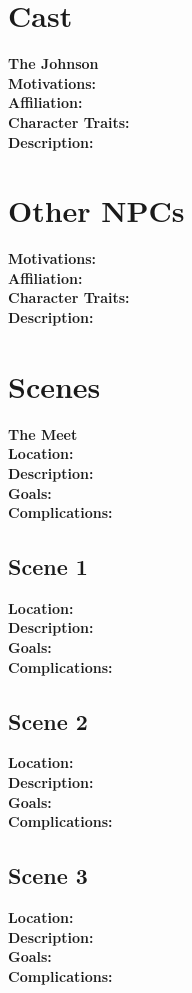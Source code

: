 \documentclass{ShadowTeXSR5}
\begin{document}
\section{Cast}
\textbf{The Johnson}\\
\textbf{Motivations:}\\
\textbf{Affiliation:}\\
\textbf{Character Traits:}\\
\textbf{Description:}

\section{Other NPCs}
\textbf{Motivations:}\\
\textbf{Affiliation:}\\
\textbf{Character Traits:}\\
\textbf{Description:}\\

\section{Scenes}
\textbf{The Meet}\\
\textbf{Location:}\\
\textbf{Description:}\\
\textbf{Goals:}\\
\textbf{Complications:}

\subsection{Scene 1}
\textbf{Location:}\\
\textbf{Description:}\\
\textbf{Goals:}\\
\textbf{Complications:}

\subsection{Scene 2}
\textbf{Location:}\\
\textbf{Description:}\\
\textbf{Goals:}\\
\textbf{Complications:}\\

\subsection{Scene 3}
\textbf{Location:}\\
\textbf{Description:}\\
\textbf{Goals:}\\
\textbf{Complications:}\\
\end{document}
